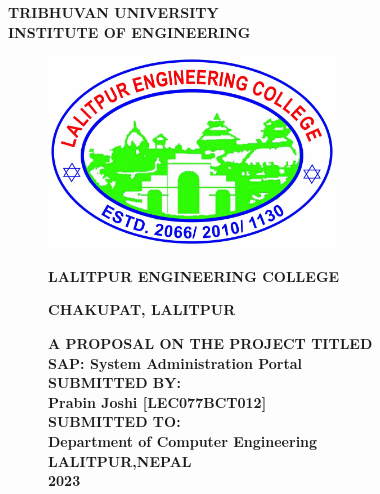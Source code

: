 \begin{center}
        {\fontsize{14pt}{20}\selectfont \textbf{\MakeUppercase{Tribhuvan University}}}\\
        {\fontsize{14pt}{20}\selectfont \textbf{\MakeUppercase{institute of engineering}}}
        \vspace{0.6in}
\end{center}
\begin{figure}[h]
\centering
    \includegraphics[width = 3in]{Proposal/static/LECLogo.jpg}
    \vspace{0.6in}
    \begin{center}
        \vspace{2mm}
        {\fontsize{14pt}{20}\selectfont \textbf{\MakeUppercase{Lalitpur Engineering College}}}
        \vspace{2mm}
        
        {\fontsize{14pt}{5}\selectfont \textbf{\MakeUppercase{Chakupat, lalitpur}}}
    \end{center}
    \vspace{0.4in}
\begin{center}
{\fontsize{14pt}{20}\selectfont \textbf{\MakeUppercase{a proposal on the project titled}}}\\
{\fontsize{14pt}{20}\selectfont \textbf{SAP: System Administration Portal}}\\
\vspace{0.6in}
    {\fontsize{14pt}{20}\selectfont \textbf{\MakeUppercase{submitted by:}}}\\
    {\fontsize{14pt}{20}\selectfont \textbf{Prabin Joshi [LEC077BCT012]}}\\
\vspace{0.6in}
    {\fontsize{14pt}{20}\selectfont \textbf{\MakeUppercase{submitted to:}}}\\
    {\fontsize{14pt}{20}\selectfont \textbf{Department of Computer Engineering}}\\
\vspace{0.6in}
    {\fontsize{14pt}{20}\selectfont \textbf{\MakeUppercase{Lalitpur,Nepal}}}\\
    {\fontsize{14pt}{20}\selectfont \textbf{2023}}\\
\end{center}
\end{figure}
\newpage